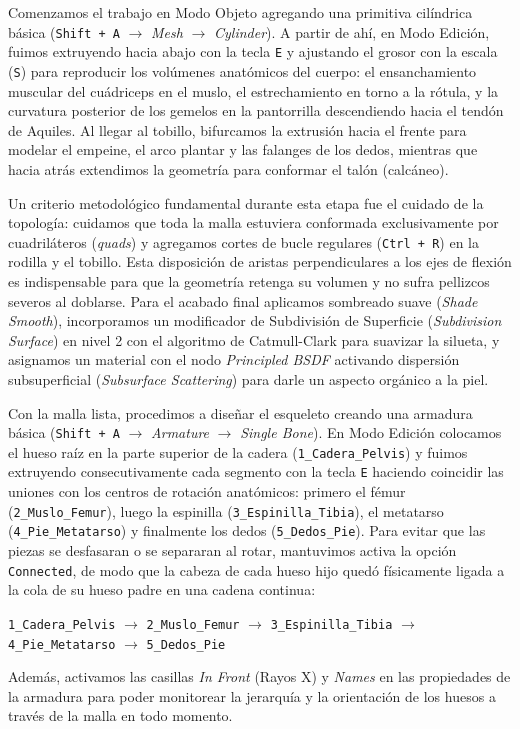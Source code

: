 Comenzamos el trabajo en Modo Objeto agregando una primitiva cilíndrica básica (\texttt{Shift + A} $\to$ \textit{Mesh} $\to$ \textit{Cylinder}). A partir de ahí, en Modo Edición, fuimos extruyendo hacia abajo con la tecla \texttt{E} y ajustando el grosor con la escala (\texttt{S}) para reproducir los volúmenes anatómicos del cuerpo: el ensanchamiento muscular del cuádriceps en el muslo, el estrechamiento en torno a la rótula, y la curvatura posterior de los gemelos en la pantorrilla descendiendo hacia el tendón de Aquiles. Al llegar al tobillo, bifurcamos la extrusión hacia el frente para modelar el empeine, el arco plantar y las falanges de los dedos, mientras que hacia atrás extendimos la geometría para conformar el talón (calcáneo).

Un criterio metodológico fundamental durante esta etapa fue el cuidado de la topología: cuidamos que toda la malla estuviera conformada exclusivamente por cuadriláteros (\textit{quads}) y agregamos cortes de bucle regulares (\texttt{Ctrl + R}) en la rodilla y el tobillo. Esta disposición de aristas perpendiculares a los ejes de flexión es indispensable para que la geometría retenga su volumen y no sufra pellizcos severos al doblarse. Para el acabado final aplicamos sombreado suave (\textit{Shade Smooth}), incorporamos un modificador de Subdivisión de Superficie (\textit{Subdivision Surface}) en nivel 2 con el algoritmo de Catmull-Clark para suavizar la silueta, y asignamos un material con el nodo \textit{Principled BSDF} activando dispersión subsuperficial (\textit{Subsurface Scattering}) para darle un aspecto orgánico a la piel.

Con la malla lista, procedimos a diseñar el esqueleto creando una armadura básica (\texttt{Shift + A} $\to$ \textit{Armature} $\to$ \textit{Single Bone}). En Modo Edición colocamos el hueso raíz en la parte superior de la cadera (\texttt{1\_Cadera\_Pelvis}) y fuimos extruyendo consecutivamente cada segmento con la tecla \texttt{E} haciendo coincidir las uniones con los centros de rotación anatómicos: primero el fémur (\texttt{2\_Muslo\_Femur}), luego la espinilla (\texttt{3\_Espinilla\_Tibia}), el metatarso (\texttt{4\_Pie\_Metatarso}) y finalmente los dedos (\texttt{5\_Dedos\_Pie}). Para evitar que las piezas se desfasaran o se separaran al rotar, mantuvimos activa la opción \texttt{Connected}, de modo que la cabeza de cada hueso hijo quedó físicamente ligada a la cola de su hueso padre en una cadena continua:
\begin{center}
\texttt{1\_Cadera\_Pelvis} $\longrightarrow$ \texttt{2\_Muslo\_Femur} $\longrightarrow$ \texttt{3\_Espinilla\_Tibia} $\longrightarrow$ \texttt{4\_Pie\_Metatarso} $\longrightarrow$ \texttt{5\_Dedos\_Pie}
\end{center}
Además, activamos las casillas \textit{In Front} (Rayos X) y \textit{Names} en las propiedades de la armadura para poder monitorear la jerarquía y la orientación de los huesos a través de la malla en todo momento.

